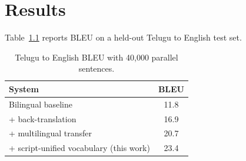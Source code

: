 \chapter{Results}
\label{ch:results}

Table~\ref{tab:bleu} reports BLEU on a held-out Telugu to English test set.

\begin{table}[htbp]
  \centering
  \caption{Telugu to English BLEU with 40,000 parallel sentences.}
  \label{tab:bleu}
  \begin{tabular}{lc}
    \toprule
    System & BLEU \\
    \midrule
    Bilingual baseline                         & 11.8 \\
    + back-translation                         & 16.9 \\
    + multilingual transfer                    & 20.7 \\
    + script-unified vocabulary (this work)    & 23.4 \\
    \bottomrule
  \end{tabular}
\end{table}
